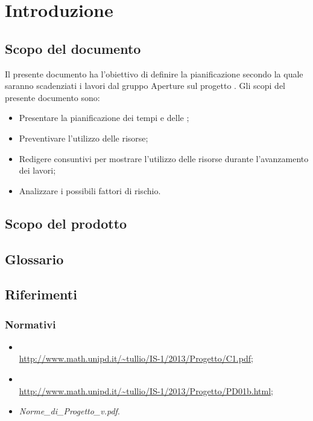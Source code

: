 \newpage
\tableofcontents

\newpage
\listoftables
\listoffigures


\newpage
\section{Introduzione}
\label{1.0}
\subsection{Scopo del documento}
\label{1.1}
Il presente documento ha l'obiettivo di definire la pianificazione secondo la quale saranno scadenziati i lavori dal gruppo Aperture  sul progetto \Progetto{}.
Gli scopi del presente documento sono:
\begin{itemize}
\item Presentare la pianificazione dei tempi e delle ;
\item Preventivare l'utilizzo delle risorse;
\item Redigere consuntivi per mostrare l'utilizzo delle risorse durante l'avanzamento dei lavori;
\item Analizzare i possibili fattori di rischio.
\end{itemize}

\subsection{Scopo del prodotto}
\label{1.2}
\Prodotto{}

\subsection{Glossario}
\label{1.3}
\Glossario{}

\subsection{Riferimenti}
\label{1.4}
\subsubsection{Normativi}
\label{1.4.1}
\begin{itemize}
\item {}\\ \url{http://www.math.unipd.it/~tullio/IS-1/2013/Progetto/C1.pdf};
\item {}\\ \url{http://www.math.unipd.it/~tullio/IS-1/2013/Progetto/PD01b.html};
\item {} \emph{Norme\_{}di\_{}Progetto\_{}v\versioneNormeDiProgetto{}.pdf}.\\
\end{itemize}


